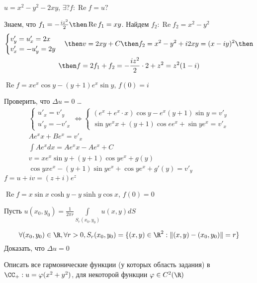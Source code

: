 \begin{problem}
    $u = x^2 - y^2 - 2xy$, $\exists ?f: \operatorname{Re} f = u ?$
\end{problem}
\begin{sol} \hfill \newline
    Знаем, что $f_1 = -\frac{iz^2}{2} \then \operatorname{Re} f_1 = xy$. Найдем $f_2: \operatorname{Re} f_2 = x^2 - y^2$
    \begin{gather*}
        \begin{cases}
            v'_y = u'_x = 2x \\ 
            v'_x = -u'_y = 2y
        \end{cases} \then v = 2xy + C  \then f_2 = x^2 - y^2 + i2xy = (x-iy)^2  \then \\ 
        \then f = 2f_1 + f_2 = -\frac{iz^2}{2} \cdot 2 + z^2 = z^2(1 - i)
    \end{gather*}
\end{sol}
\begin{problem} \hfill \newline
    $\operatorname{Re} f = xe^x\cos y - (y + 1)e^x\sin y$, $f(0) = i$
\end{problem}
\begin{sol}
    Проверить, что $\Delta u = 0$ \dots
    \begin{gather*}
        \begin{cases}
            u'_x = v'_y \\ 
            u'_y = -v'_x
        \end{cases} \iff 
        \begin{cases}
            (e^x + e^x \cdot x) \cos y - e^x(y + 1) \sin y = v'_y \\ 
            \sin y e^x x + (y + 1) \cos e e^x + \sin y e^x = v'_x 
        \end{cases} \\ 
        Ae^x x+ Be^x = v'_x \\ 
        \int Ae^x dx = Ae^x x - A e^x +C \\ 
        v = xe^x \sin y + (y + 1) \cos y e^x + g(y) \\ 
        \cos y x e^x - (y + 1) \sin y e^x + \cos y e^x + g'(y) = v'_y
    \end{gather*} 
    $f = u + iv = (z + i)e^z$
\end{sol}
\begin{problem} \hfill \newline
    $\operatorname{Re} f = x \sin x \cosh y - y \sinh y \cos x$, $f(0) = 0$
\end{problem}
\begin{problem}
    Пусть $u(x_0, y_0) = \frac{1}{2\pi r}\int\limits_{S_r(x_0, y_0)}u(x,y) dS$

    $$\forall (x_0, y_0) \in \R, \forall r > 0, S_r(x_0, y_0) = \{(x, y) \in \R^2: \|(x, y) - (x_0, y_0)\| = r \}$$
    Доказать, что $\Delta u = 0$
\end{problem}
\begin{problem}
    Описать все гармонические функции (у которых область задания) в $\CC_+ : u = \varphi(x^2 + y^2)$, для некоторой функции $\varphi \in C^2(\R)$
\end{problem}